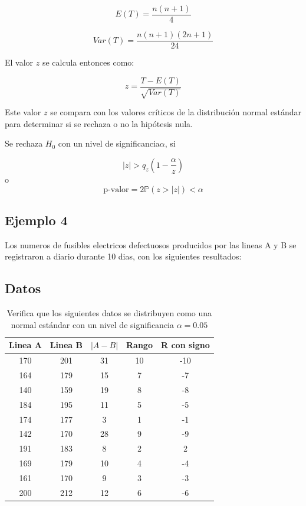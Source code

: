 \documentclass{article}
\begin{document}
\[
    E(T) = \frac{n(n + 1)}{4}
\]

\[
    Var(T) = \frac{n(n + 1)(2n + 1)}{24}
\]

El valor $z$ se calcula entonces como:

\[
    z = \frac{T - E(T)}{\sqrt{Var(T)}}
\]

Este valor $z$ se compara con los valores críticos de la distribución normal estándar para determinar si se rechaza o no la hipótesis nula.


Se rechaza $H_0$ con un nivel de significancia$\alpha$, si

\[|z| > q_z(1-\frac{\alpha}{z})\]
o
\[\text{p-valor} = 2\mathbb{P}(z > |z|) < \alpha\]

\subsection*{Ejemplo 4}

Los numeros de fusibles electricos defectuosos producidos por las lineas A y B se registraron a diario durante 10 dias, con los siguientes resultados:

\subsection*{Datos}
\begin{table}[ht]
    \centering
    \caption{Verifica que los siguientes datos se distribuyen como una normal estándar con un nivel de significancia $\alpha=0.05$}
    \begin{tabular}{ccccc}
        \toprule
        Linea A & Linea B & $| A - B|$ & Rango & R con signo \\
        \midrule
        170     & 201     & 31         & 10    & -10         \\
        164     & 179     & 15         & 7     & -7          \\
        140     & 159     & 19         & 8     & -8          \\
        184     & 195     & 11         & 5     & -5          \\
        174     & 177     & 3          & 1     & -1          \\
        142     & 170     & 28         & 9     & -9          \\
        191     & 183     & 8          & 2     & 2           \\
        169     & 179     & 10         & 4     & -4          \\
        161     & 170     & 9          & 3     & -3          \\
        200     & 212     & 12         & 6     & -6          \\
        \bottomrule
    \end{tabular}
\end{table}
\end{document}
